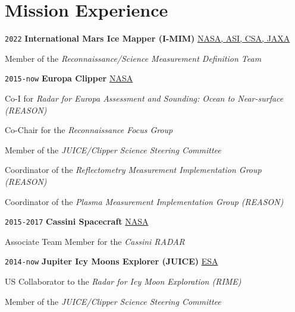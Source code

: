 \section*{Mission Experience}

\TabPositions{6em,33em}

\noindent \texttt{2022} \tab \textbf{International Mars Ice Mapper (I-MIM)} \tab
\href{https://europa.nasa.gov/}{NASA, ASI, CSA, JAXA}
\begin{adjustwidth}{2.5em}{}
Member of the \textit{Reconnaissance/Science Measurement Definition Team}
\end{adjustwidth}
\vspace{.5em}

\noindent \texttt{2015-now} \tab \textbf{Europa Clipper} \tab
\href{https://europa.nasa.gov/}{NASA}
\begin{adjustwidth}{2.5em}{}
Co-I for \textit{Radar for Europa Assessment and Sounding: Ocean to Near-surface (REASON)}
\end{adjustwidth}
\begin{adjustwidth}{2.5em}{}
Co-Chair for the \textit{Reconnaissance Focus Group}
\end{adjustwidth}
\begin{adjustwidth}{2.5em}{}
Member of the \textit{JUICE/Clipper Science Steering Committee}
\end{adjustwidth}
\begin{adjustwidth}{2.5em}{}
Coordinator of the \textit{Reflectometry Measurement Implementation Group (REASON)}
\end{adjustwidth}
\begin{adjustwidth}{2.5em}{}
Coordinator of the \textit{Plasma Measurement Implementation Group (REASON)}
\end{adjustwidth}
\vspace{.5em}

\noindent \texttt{2015-2017} \tab \textbf{Cassini Spacecraft} \tab
\href{https://www.nasa.gov/mission_pages/cassini/main/index.html}{NASA}
\begin{adjustwidth}{2.5em}{}
Associate Team Member for the \textit{Cassini RADAR}
\end{adjustwidth}
\vspace{.5em}

\noindent \texttt{2014-now} \tab \textbf{Jupiter Icy Moons Explorer (JUICE)} \tab
\href{https://sci.esa.int/web/juice}{ESA}
\begin{adjustwidth}{2.5em}{}
US Collaborator to the \textit{Radar for Icy Moon Exploration (RIME)}
\end{adjustwidth}
\begin{adjustwidth}{2.5em}{}
Member of the \textit{JUICE/Clipper Science Steering Committee}
\end{adjustwidth}
\vspace{.5em}

